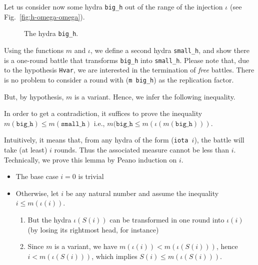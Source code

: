 

Let us consider now some hydra \texttt{big\_h} out of the range of the injection $\iota$ (see Fig.~\vref{fig:h-omega-omega}).

\begin{figure}[htb]
\centering
{}
\caption{\label{fig:h-omega-omega}}
 The hydra \texttt{big\_h}.
\end{figure}




 Using the functions $m$ and $\iota$, we define a second hydra \texttt{small\_h}, and show
 there is a one-round battle that transforms \texttt{big\_h} into \texttt{small\_h}. Please note that,
due to the hypothesis \texttt{Hvar}, we are interested in the termination of \emph{free} battles. 
There is no problem to consider a round with (\texttt{m big\_h}) as the replication factor.





 
But, by hypothesis, $m$ is a variant. Hence, we infer the following inequality.

\vspace{4pt}




In order to get a contradiction, it suffices to  prove the inequality
$m(\texttt{big\_h}) \leq m(\texttt{small\_h})$ i.e.,  $m(\texttt{big\_h}\leq m(\iota (m(\texttt{big\_h})))$.





Intuitively, it means that, from any hydra of the form (\texttt{iota $i$}), the battle will 
take (at least) $i$ rounds. Thus the associated measure cannot be less than $i$.
Technically, we prove this lemma by Peano induction on $i$.

\begin{itemize}
\item The base case $i=0$ is trivial
\item Otherwise, let $i$ be any natural number and assume  the inequality
  $i \leq m(\iota(i))$.
  \begin{enumerate}
  \item  But the hydra $\iota(S(i))$ can be transformed in one round into
    $\iota(i)$ (by losing its rightmost head, for instance)
  \item Since $m$ is a variant, we have $m(\iota(i)) < m(\iota(S(i)))$,
    hence  $i< m(\iota(S(i)))$, which implies  $S(i)\leq  m(\iota(S(i)))$.
  \end{enumerate}
\end{itemize}

